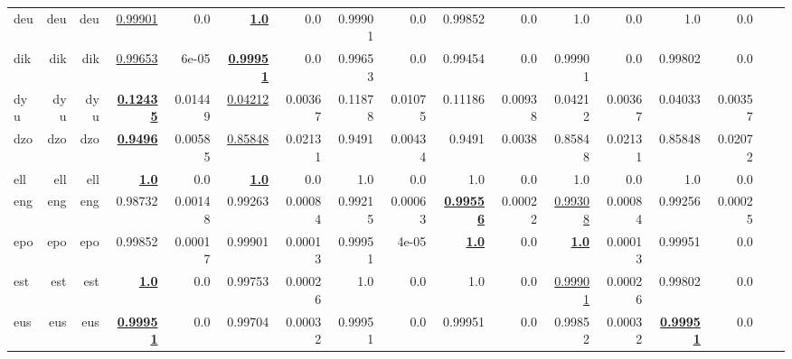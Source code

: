 \documentclass[11pt]{article}
\begin{document}
\begin{table*}[h]
{\begin{tabular}{lrrrrrrrrrrrrrrrr}
deu         & deu         & deu         & \underline{0.99901}         & 0.0         & \textbf{\underline{1.0}}         & 0.0         & 0.99901         & 0.0         & 0.99852         & 0.0         & 1.0         & 0.0         & 1.0         & 0.0         \\
dik         & dik         & dik         & \underline{0.99653}         & 6e-05         & \textbf{\underline{0.99951}}         & 0.0         & 0.99653         & 0.0         & 0.99454         & 0.0         & 0.99901         & 0.0         & 0.99802         & 0.0         \\
dyu         & dyu         & dyu         & \textbf{\underline{0.12435}}         & 0.01449         & \underline{0.04212}         & 0.00367         & 0.11878         & 0.01075         & 0.11186         & 0.00938         & 0.04212         & 0.00367         & 0.04033         & 0.00357         \\
dzo         & dzo         & dzo         & \textbf{\underline{0.9496}}         & 0.00585         & \underline{0.85848}         & 0.02131         & 0.9491         & 0.00434         & 0.9491         & 0.0038         & 0.85848         & 0.02131         & 0.85848         & 0.02072         \\
ell         & ell         & ell         & \textbf{\underline{1.0}}         & 0.0         & \textbf{\underline{1.0}}         & 0.0         & 1.0         & 0.0         & 1.0         & 0.0         & 1.0         & 0.0         & 1.0         & 0.0         \\
eng         & eng         & eng         & 0.98732         & 0.00148         & 0.99263         & 0.00084         & 0.99215         & 0.00063         & \textbf{\underline{0.99556}}         & 0.00022         & \underline{0.99308}         & 0.00084         & 0.99256         & 0.00025         \\
epo         & epo         & epo         & 0.99852         & 0.00017         & 0.99901         & 0.00013         & 0.99951         & 4e-05         & \textbf{\underline{1.0}}         & 0.0         & \textbf{\underline{1.0}}         & 0.00013         & 0.99951         & 0.0         \\
est         & est         & est         & \textbf{\underline{1.0}}         & 0.0         & 0.99753         & 0.00026         & 1.0         & 0.0         & 1.0         & 0.0         & \underline{0.99901}         & 0.00026         & 0.99802         & 0.0         \\
eus         & eus         & eus         & \textbf{\underline{0.99951}}         & 0.0         & 0.99704         & 0.00032         & 0.99951         & 0.0         & 0.99951         & 0.0         & 0.99852         & 0.00032         & \textbf{\underline{0.99951}}         & 0.0         \\

\end{tabular}}
\end{table*}
\end{document}
